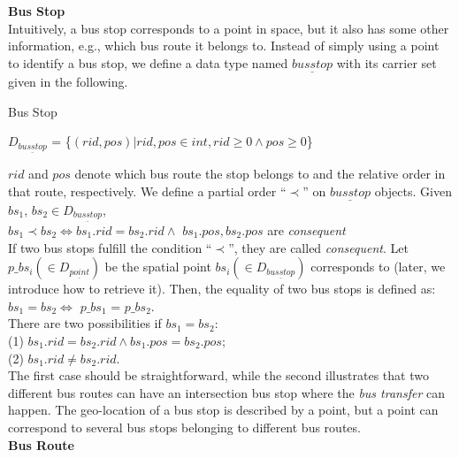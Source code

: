 \textbf{Bus Stop} \\

Intuitively, a bus stop corresponds to a point in space, but it also has some other 
information, e.g., which bus route it belongs to. Instead of simply using a point to identify 
a bus stop, we define a data type named $\underline{busstop}$ with its carrier set given
in the following. 
 
\begin{Statement}
\label{defintionbusstop}
 Bus Stop 

$D_{\underline{busstop}}$ = \{$(rid, pos)|rid, pos \in int, rid\geq 0 \wedge pos \geq 0$\}
\end{Statement}

$rid$ and $pos$ denote which bus route the stop belongs to and the relative order in that route, respectively. We define a partial order ``$\prec$'' on $\underline{busstop}$ objects. Given $bs_1$, $bs_2 \in D_{\underline{busstop}}$, \\

$bs_1 \prec bs_2 \Leftrightarrow bs_1.rid=bs_2.rid \wedge$ $bs_1.pos,bs_2.pos$ are \textit{consequent}  \\

If two bus stops fulfill the condition ``$\prec$'', they are called \textit{consequent}. 
Let $p\_bs_i(\in D_{\underline{point}})$ be the spatial point $bs_i(\in D_{\underline{busstop}})$ corresponds to (later, we introduce how to retrieve it). Then, the equality of two bus stops is defined as:  \\

$bs_1=bs_2\Leftrightarrow$ $p\_bs_1$ = $p\_bs_2$. \\

There are two possibilities if $bs_1=bs_2$: \\

(1) $bs_1.rid=bs_2.rid \wedge bs_1.pos=bs_2.pos$; \\

(2) $bs_1.rid\neq bs_2.rid$. \\

The first case should be straightforward, while the second illustrates that two 
different bus routes can have an intersection bus stop where the \textit{bus transfer} can happen. 
The geo-location of a bus stop is described by a point, but a point
can correspond to several bus stops belonging to different bus routes. \\

\textbf{Bus Route} \\

